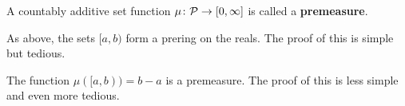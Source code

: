 \begin{definition}
    A countably additive set function $\mu \colon \mathcal P \to [0, \infty]$ is called a \textbf{premeasure}.
\end{definition}

\begin{example}
    As above, the sets $[a, b)$ form a prering on the reals. The proof of this is simple but tedious.

    The function $\mu([a, b)) = b - a$ is a premeasure. The proof of this is less simple and even more tedious.
\end{example}